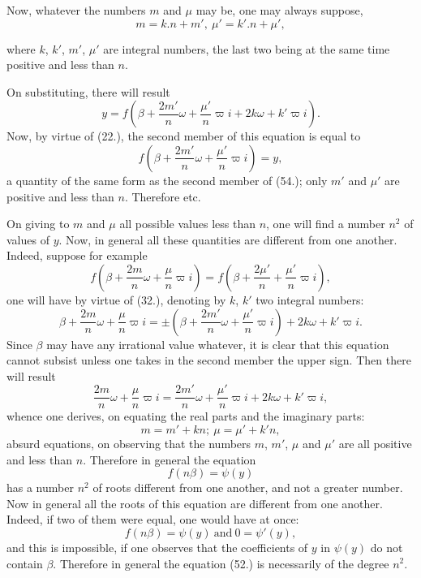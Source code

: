 \documentclass{article}
\begin{document}
Now, whatever the numbers $m$ and $\mu$ may be, one may always suppose,
\[ m=k.n+m',\ \mu'=k'.n+\mu', \]

where $k$, $k'$, $m'$, $\mu'$ are integral numbers, the last two being at the same time positive and less than $n$.

On substituting, there will result
\[ y=f\left(\beta+\frac{2m'}{n}\omega+\frac{\mu'}{n}\varpi i+2k\omega+k'\varpi i\right). \]
Now, by virtue of (22.), the second member of this equation is equal to
\[ f\left(\beta+\frac{2m'}{n}\omega+\frac{\mu'}{n}\varpi i\right)=y, \tag{55.} \]
a quantity of the same form as the second member of (54.); only $m'$ and $\mu'$ are positive and less than $n$. Therefore etc.

On giving to $m$ and $\mu$ all possible values less than $n$, one will find a number $n^{2}$ of values of $y$. Now, in general all these quantities are different from one another. Indeed, suppose for example
\[ f\left(\beta+\frac{2m}{n}\omega+\frac{\mu}{n}\varpi i\right)=f\left(\beta+\frac{2\mu'}{n}+\frac{\mu'}{n}\varpi i\right), \]
one will have by virtue of (32.), denoting by $k$, $k'$ two integral numbers:
\[ \beta+\frac{2m}{n}\omega+\frac{\mu}{n}\varpi i=\pm\left(\beta+\frac{2m'}{n}\omega+\frac{\mu'}{n}\varpi i\right)+2k\omega+k'\varpi i. \]
Since $\beta$ may have any irrational value whatever, it is clear that this equation cannot subsist unless one takes in the second member the upper sign. Then there will result
\[ \frac{2m}{n}\omega+\frac{\mu}{n}\varpi i=\frac{2m'}{n}\omega+\frac{\mu'}{n}\varpi i+2k\omega+k'\varpi i, \]
whence one derives, on equating the real parts and the imaginary parts:
\[ m=m'+kn;\ \mu=\mu'+k'n, \]
absurd equations, on observing that the numbers $m$, $m'$, $\mu$ and $\mu'$ are all positive and less than $n$. Therefore in general the equation
\[ f(n\beta)=\psi(y) \]
has a number $n^{2}$ of roots different from one another, and not a greater number. Now in general all the roots of this equation are different from one another. Indeed, if two of them were equal, one would have at once:
\[ f(n\beta)=\psi(y)\ \text{and}\ 0=\psi'(y), \]
and this is impossible, if one observes that the coefficients of $y$ in $\psi(y)$ do not contain $\beta$. Therefore in general the equation (52.) is necessarily of the degree $n^{2}$.
\end{document}
